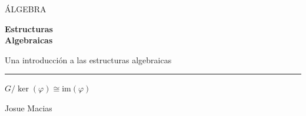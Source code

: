 \documentclass[11pt]{article}
\begin{document}
\pagecolor{coverbg}
\vspace*{22mm}
\begin{center}
  {\large\color{coveraccent}\MakeUppercase{Álgebra}\par}
  \vspace{9mm}
  {\Huge\bfseries\color{coverink}Estructuras\\[2mm] Algebraicas\par}
  \vspace{5mm}
  {\large\color{coverink}Una introducción a las estructuras algebraicas\par}
  \vspace{25mm}
  {\color{coveraccent}\rule{130mm}{1pt}\par}
  \vspace{25mm}
  {\LARGE\color{coverink}\(\displaystyle G/\ker(\varphi)\cong\mathrm{im}(\varphi)\)\par}
  \vfill
  {\large\color{coverink}Josue Macias\par}
  \vspace{20mm}
\end{center}
\end{document}
